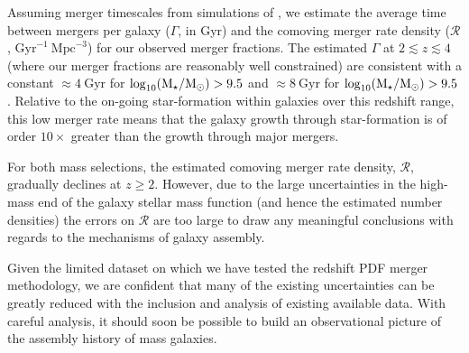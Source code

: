 Assuming merger timescales from simulations of \citet{Lotz:2010ie}, we estimate the average time between mergers per galaxy ($\Gamma$, in Gyr) and the comoving merger rate density ($\mathcal{R}$, $\text{Gyr}^{-1} ~ \text{Mpc}^{-3}$) for our observed merger fractions. The estimated $\Gamma$ at $2 \lesssim z \lesssim 4$ (where our merger fractions are reasonably well constrained) are consistent with a constant $\approx 4 ~\text{Gyr}$ for $\log_{10}(\text{M}_{\star} / \text{M}_{\odot}) > 9.5$ and $\approx 8 ~\text{Gyr}$ for $\log_{10}(\text{M}_{\star} / \text{M}_{\odot}) > 9.5$. Relative to the on-going star-formation within galaxies over this redshift range, this low merger rate means that the galaxy growth through star-formation is of order $10\times$ greater than the growth through major mergers.

For both mass selections, the estimated comoving merger rate density, $\mathcal{R}$, gradually declines at $z\geq 2$. However, due to the large uncertainties in the high-mass end of the galaxy stellar mass function (and hence the estimated number densities) the errors on $\mathcal{R}$ are too large to draw any meaningful conclusions with regards to the mechanisms of galaxy assembly.

Given the limited dataset on which we have tested the redshift PDF merger methodology, we are confident that many of the existing uncertainties can be greatly reduced with the inclusion and analysis of existing available data. With careful analysis, it should soon be possible to build an observational picture of the assembly history of mass galaxies.



